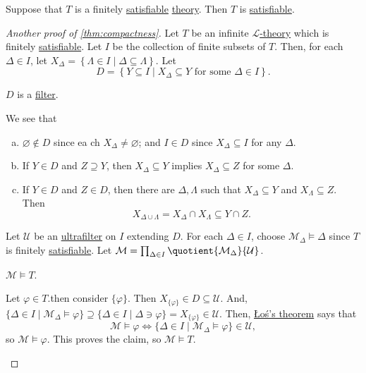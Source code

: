\begin{prev}
	Suppose that \(T\) is a finitely \hyperref[def:satisfiable]{satisfiable} \hyperref[def:theory]{theory}. Then \(T\) is \hyperref[def:satisfiable]{satisfiable}.
\end{prev}
\begin{proof}[Another proof of \autoref{thm:compactness}]
	Let \(T\) be an infinite \hyperref[def:theory]{\(\mathcal{L} \)-theory} which is finitely \hyperref[def:satisfiable]{satisfiable}. Let \(I\) be the collection of finite subsets of \(T\). Then, for each \(\Delta \in I\), let \(X_\Delta = \left\{ \Lambda \in I \mid \Delta  \subseteq \Lambda  \right\} \). Let
	\[
		D = \left\{ Y \subseteq I \mid X_\Delta \subseteq Y\text{ for some } \Delta \in I \right\}.
	\]

	\begin{claim}
		\(D\) is a \hyperref[def:filter]{filter}.
	\end{claim}
	\begin{explanation}
		We see that
		\begin{enumerate}[(a)]
			\item \(\varnothing \notin D\) since ea ch \(X_\Delta \neq \varnothing \); and \(I \in D\) since \(X_\Delta \subseteq I\) for any \(\Delta \).
			\item If \(Y\in D\) and \(Z\supseteq Y\), then \(X_\Delta \subseteq Y\) implies \(X_\Delta \subseteq Z\) for some \(\Delta \).
			\item If \(Y\in D\) and \(Z\in D\), then there are \(\Delta , \Lambda \) such that \(X_\Delta \subseteq Y\) and \(X_\Lambda \subseteq Z\). Then
			      \[
				      X_{\Delta \cup \Lambda } = X_\Delta \cap X_\Lambda \subseteq Y \cap Z.
			      \]
		\end{enumerate}
	\end{explanation}

	Let \(\mathcal{U} \) be an \hyperref[def:ultrafilter]{ultrafilter} on \(I\) extending \(D\). For each \(\Delta \in I\), choose \(\mathcal{M} _\Delta \models \Delta \) since \(T\) is finitely \hyperref[def:satisfiable]{satisfiable}. Let \(\mathcal{M} = \prod_{\Delta \in I} \quotient{\mathcal{M} _\Delta }{\mathcal{U} } \).

	\begin{claim}
		\(\mathcal{M} \models T\).
	\end{claim}
	\begin{explanation}
		Let \(\varphi \in T\).then consider \(\{ \varphi \} \). Then \(X_{\{ \varphi  \} }\in D \subseteq \mathcal{U} \). And, \(\{ \Delta \in I \mid \mathcal{M} _\Delta \models \varphi \} \supseteq \{ \Delta \in I \mid \Delta  \ni \varphi \} = X_{\{ \varphi \} } \in \mathcal{U} \). Then, \hyperref[thm:Los]{Łoś's theorem} says that
		\[
			\mathcal{M} \models \varphi \iff \{ \Delta \in I \mid \mathcal{M} _\Delta \models \varphi  \} \in \mathcal{U} ,
		\]
		so \(\mathcal{M} \models \varphi \). This proves the claim, so \(\mathcal{M} \models T\).
	\end{explanation}
\end{proof}

